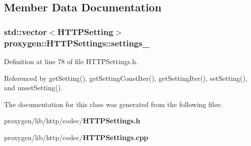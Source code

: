 \subsection{Member Data Documentation}
\subsubsection[{settings\+\_\+}]{\setlength{\rightskip}{0pt plus 5cm}std\+::vector$<${\bf H\+T\+T\+P\+Setting}$>$ proxygen\+::\+H\+T\+T\+P\+Settings\+::settings\+\_\+\hspace{0.3cm}{\ttfamily [private]}}\label{classproxygen_1_1HTTPSettings_af5d8be24c4dd91fc7caa1d4d23cbfaac}


Definition at line 78 of file H\+T\+T\+P\+Settings.\+h.



Referenced by get\+Setting(), get\+Setting\+Const\+Iter(), get\+Setting\+Iter(), set\+Setting(), and unset\+Setting().



The documentation for this class was generated from the following files\+:\begin{DoxyCompactItemize}
\item 
proxygen/lib/http/codec/{\bf H\+T\+T\+P\+Settings.\+h}\item 
proxygen/lib/http/codec/{\bf H\+T\+T\+P\+Settings.\+cpp}\end{DoxyCompactItemize}
